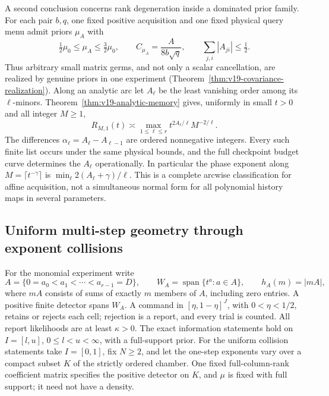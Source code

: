 A second conclusion concerns rank degeneration inside a dominated
prior family. For each pair $b,q$, one fixed positive acquisition and
one fixed physical query menu admit priors $\mu_A$ with
\[
 \tfrac12\mu_0\le\mu_A\le\tfrac32\mu_0,\qquad
 C_{\mu_A}=\frac{A}{8b\sqrt q},\qquad
 \sum_{j,i}|A_{ji}|\le\tfrac12.
\]
Thus arbitrary small matrix germs, and not only a scalar cancellation,
are realized by genuine priors in one experiment
(Theorem~\ref{thm:v19-covariance-realization}). Along an analytic
arc let $A_\ell$ be the least vanishing order among its $\ell$-minors.
Theorem~\ref{thm:v19-analytic-memory} gives, uniformly in small
$t>0$ and all integer $M\ge1$,
\[
 R_{M,1}(t)\asymp
     \max_{1\le\ell\le r}t^{2A_\ell/\ell}M^{-2/\ell}.
\]
The differences $\alpha_\ell=A_\ell-A_{\ell-1}$ are ordered
nonnegative integers. Every such finite list occurs under the same
physical bounds, and the full checkpoint budget curve determines the
$A_\ell$ operationally. In particular the phase exponent along
$M=\lceil t^{-\gamma}\rceil$ is
$\min_\ell 2(A_\ell+\gamma)/\ell$. This is a complete arcwise
classification for affine acquisition, not a simultaneous normal form
for all polynomial history maps in several parameters.

\subsection{Uniform multi-step geometry through exponent collisions}
For the monomial experiment write
\[
 A=\{0=a_0<a_1<\cdots<a_{r-1}=D\},\qquad
 W_A=\operatorname{span}\{t^a:a\in A\},\qquad h_A(m)=|mA|,
\]
where $mA$ consists of sums of exactly $m$ members of $A$, including
zero entries. A positive finite detector spans $W_A$. A command in
$[\eta,1-\eta]^J$, with $0<\eta<1/2$, retains or rejects each cell;
rejection is a report, and every trial is counted. All report
likelihoods are at least $\kappa>0$. The exact information statements
hold on $I=[l,u]$, $0\le l<u<\infty$, with a full-support prior.
For the uniform collision statements take $I=[0,1]$, fix $N\ge2$,
and let the one-step exponents vary over a compact subset $K$ of the
strictly ordered chamber. One fixed full-column-rank coefficient matrix
specifies the positive detector on $K$, and $\mu$ is fixed with full
support; it need not have a density.

